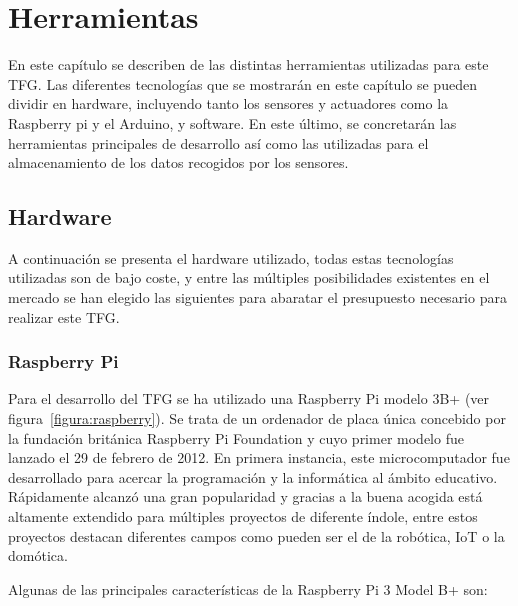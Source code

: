 \documentclass[a4paper, 12pt, oneside]{book}
\begin{document}

\cleardoublepage %
\chapter{Herramientas} 
\label{chap:herramientas}

En este capítulo se  describen de las distintas herramientas utilizadas para este TFG. Las diferentes tecnologías que se mostrarán en este capítulo se pueden dividir en hardware, incluyendo tanto los sensores y actuadores como la Raspberry pi y el Arduino, y software. En este último, se concretarán las herramientas principales de desarrollo así como las utilizadas para el almacenamiento de los datos recogidos por los sensores.


\section{Hardware}
\label{sec:hardware}

A continuación se presenta el hardware utilizado, todas estas tecnologías utilizadas son de bajo coste, y entre las múltiples posibilidades existentes en el mercado se han elegido las siguientes para abaratar el presupuesto necesario para realizar este TFG.

\subsection{Raspberry Pi}
\label{subsec:raspberry pi}

Para el desarrollo del TFG se ha utilizado una Raspberry Pi modelo 3B+ (ver figura~\ref{figura:raspberry}). Se trata de un ordenador de placa única concebido por la fundación británica Raspberry Pi Foundation y cuyo primer modelo fue lanzado el 29 de febrero de 2012. En primera instancia, este microcomputador fue desarrollado para acercar la programación y la informática al ámbito educativo. Rápidamente alcanzó una gran popularidad y gracias a la buena acogida está altamente extendido para múltiples proyectos de diferente índole, entre estos proyectos destacan diferentes campos como pueden ser el de la robótica, IoT o la domótica.

Algunas de las principales características de la Raspberry Pi 3 Model B+ son:
\end{document}
